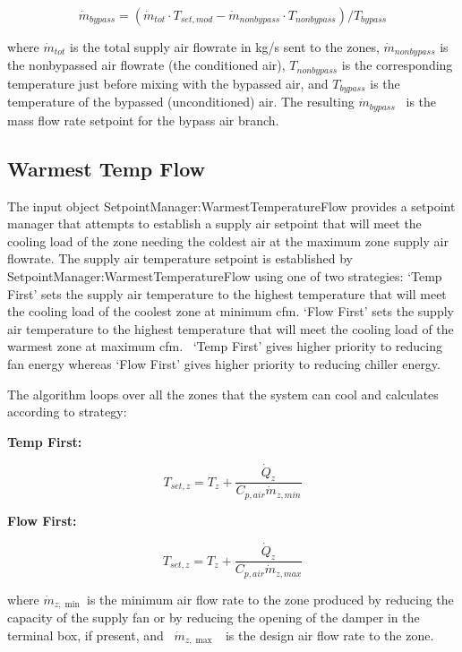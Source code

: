 \begin{equation}
{\dot m_{bypass}} = ({\dot m_{tot}}\cdot {T_{set,mod}} - {\dot m_{nonbypass}}\cdot {T_{nonbypass}})/{T_{bypass}}
\end{equation}

where \({\dot m_{tot}}\) is the total supply air flowrate in kg/s sent to the zones, \({\dot m_{nonbypass}}\) is the nonbypassed air flowrate (the conditioned air), \({T_{nonbypass}}\) is the corresponding temperature just before mixing with the bypassed air, and \({T_{bypass}}\) is the temperature of the bypassed (unconditioned) air. The resulting \({\dot m_{bypass}}\) ~is the mass flow rate setpoint for the bypass air branch.

\subsection{Warmest Temp Flow}\label{warmest-temp-flow}

The input object SetpointManager:WarmestTemperatureFlow provides a setpoint manager that attempts to establish a supply air setpoint that will meet the cooling load of the zone needing the coldest air at the maximum zone supply air flowrate. The supply air temperature setpoint is established by SetpointManager:WarmestTemperatureFlow using one of two strategies: `Temp First' sets the supply air temperature to the highest temperature that will meet the cooling load of the coolest zone at minimum cfm. `Flow First' sets the supply air temperature to the highest temperature that will meet the cooling load of the warmest zone at maximum cfm.~ `Temp First' gives higher priority to reducing fan energy whereas `Flow First' gives higher priority to reducing chiller energy.

The algorithm loops over all the zones that the system can cool and calculates according to strategy:

\textbf{Temp First:}

\begin{equation}
  T_{set,z} = T_z + \frac{\dot{Q}_z}{C_{p,air} \dot{m}_{z,min}}
\end{equation}

\textbf{Flow First:}

\begin{equation}
  T_{set,z} = T_z + \frac{\dot{Q}_z}{C_{p,air} \dot{m}_{z,max}}
\end{equation}

where \({\dot m_{z,\min }}\) is the minimum air flow rate to the zone produced by reducing the capacity of the supply fan or by reducing the opening of the damper in the terminal box, if present, and~ \({\dot m_{z,\max }}\) ~is the design air flow rate to the zone.

